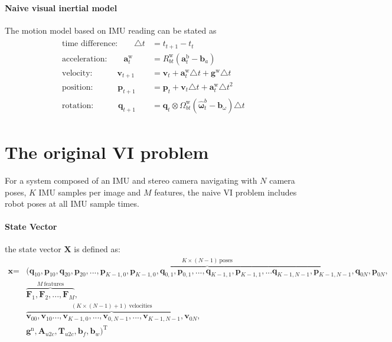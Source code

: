\documentclass[12pt]{article}   %
\begin{document}
\paragraph{Naive visual inertial model}

The motion model based on IMU reading can be stated as
\begin{align}
\begin{split}
	\textrm{time difference:}  \qquad \triangle t & =  t_{t+1} - t_t \\
	\textrm{acceleration:} 	   \qquad \bm{a}_t^{\mathrm{w}} & = R_{bt}^{\mathrm{w}}  (\bm{a}_t^{\mathrm{b}} - \bm{b}_a) \\
	\textrm{velocity:}         \qquad \quad \bm{v}_{t+1} & = \bm{v}_{t} + \bm{a}_t^{\mathrm{w}} \triangle t + \bm{g}^{\mathrm{w}} \triangle t \\
	\textrm{position:}         \qquad \quad \bm{p}_{t+1} & = \bm{p}_{t} + \bm{v}_t \triangle t + \bm{a}_t^{\mathrm{w}} \triangle t^2\\
	\textrm{rotation:}         \qquad \quad \bm{q}_{t+1} & = \bm{q}_t \otimes  \Omega_{bt}^{\mathrm{w}}  (\hat{\bm{\omega}}^b_t - \bm{b}_\omega) \triangle t
\end{split}
\label{eq.motion_model}
\end{align}

\section{The original VI problem}
For a system composed of an IMU and stereo camera navigating with $N$ camera
poses, $K$ IMU samples per image and $M$ features, the naive VI problem includes
robot poses at all IMU sample times.

\paragraph{State Vector}
the state vector $\textbf{X}$ is defined as:
\begin{align*}
\textbf{x} = &(\overbrace{\textbf{q}_{10}, \textbf{p}_{10}, \textbf{q}_{20}, \textbf{p}_{20},... ,\textbf{p}_{K-1,0}, \textbf{p}_{K-1,0},\textbf{q}_{0,1}, \textbf{p}_{0,1},...,\textbf{q}_{K-1,1}, \textbf{p}_{K-1,1},... \textbf{q}_{K-1,N-1}, \textbf{p}_{K-1,N-1},\textbf{q}_{0N}, \textbf{p}_{0N}}^{K \times (N - 1) \ {\mathrm{ poses}}},\\
	 &\overbrace{\textbf{F}_{1},\textbf{F}_{2}, ..., \textbf{F}_{M}}^{M \ {\mathrm{ features}}},\\
	 &\overbrace{\textbf{v}_{00},\textbf{v}_{10} ...,\textbf{v}_{K-1,0}, ...,\textbf{v}_{0,N-1},...,\textbf{v}_{K-1,N-1}, \textbf{v}_{0N}}^{(K \times (N-1)+1)  \ {\mathrm{ velocities}}},\\
	 &\textbf{g}^{\mathrm{n}}, \textbf{A}_{u2c}, \textbf{T}_{u2c}, \textbf{b}_f, \textbf{b}_w )^{\mathrm{T}} 
	 \label{eq.state_vector}
\end{align*}
\end{document}
